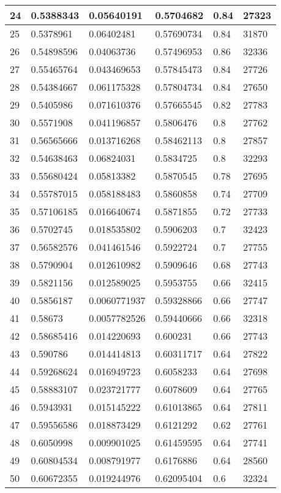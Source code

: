 \begin{longtable}{|l|l|l|l|l|l|}
24 & 0.5388343 & 0.05640191 & 0.5704682 & 0.84 & 27323 \\ \hline 
25 & 0.5378961 & 0.06402481 & 0.57690734 & 0.84 & 31870 \\ \hline 
26 & 0.54898596 & 0.04063736 & 0.57496953 & 0.86 & 32336 \\ \hline 
27 & 0.55465764 & 0.043469653 & 0.57845473 & 0.84 & 27726 \\ \hline 
28 & 0.54384667 & 0.061175328 & 0.57804734 & 0.84 & 27650 \\ \hline 
29 & 0.5405986 & 0.071610376 & 0.57665545 & 0.82 & 27783 \\ \hline 
30 & 0.5571908 & 0.041196857 & 0.5806476 & 0.8 & 27762 \\ \hline 
31 & 0.56565666 & 0.013716268 & 0.58462113 & 0.8 & 27857 \\ \hline 
32 & 0.54638463 & 0.06824031 & 0.5834725 & 0.8 & 32293 \\ \hline 
33 & 0.55680424 & 0.05813382 & 0.5870545 & 0.78 & 27695 \\ \hline 
34 & 0.55787015 & 0.058188483 & 0.5860858 & 0.74 & 27709 \\ \hline 
35 & 0.57106185 & 0.016640674 & 0.5871855 & 0.72 & 27733 \\ \hline 
36 & 0.5702745 & 0.018535802 & 0.5906203 & 0.7 & 32423 \\ \hline 
37 & 0.56582576 & 0.041461546 & 0.5922724 & 0.7 & 27755 \\ \hline 
38 & 0.5790904 & 0.012610982 & 0.5909646 & 0.68 & 27743 \\ \hline 
39 & 0.5821156 & 0.012589025 & 0.5953755 & 0.66 & 32415 \\ \hline 
40 & 0.5856187 & 0.0060771937 & 0.59328866 & 0.66 & 27747 \\ \hline 
41 & 0.58673 & 0.0057782526 & 0.59440666 & 0.66 & 32318 \\ \hline 
42 & 0.58685416 & 0.014220693 & 0.600231 & 0.66 & 27743 \\ \hline 
43 & 0.590786 & 0.014414813 & 0.60311717 & 0.64 & 27822 \\ \hline 
44 & 0.59268624 & 0.016949723 & 0.6058233 & 0.64 & 27698 \\ \hline 
45 & 0.58883107 & 0.023721777 & 0.6078609 & 0.64 & 27765 \\ \hline 
46 & 0.5943931 & 0.015145222 & 0.61013865 & 0.64 & 27811 \\ \hline 
47 & 0.59556586 & 0.018873429 & 0.6121292 & 0.62 & 27761 \\ \hline 
48 & 0.6050998 & 0.009901025 & 0.61459595 & 0.64 & 27741 \\ \hline 
49 & 0.60804534 & 0.008791977 & 0.6176886 & 0.64 & 28560 \\ \hline 
50 & 0.60672355 & 0.019244976 & 0.62095404 & 0.6 & 32324 \\ \hline 
\end{longtable}